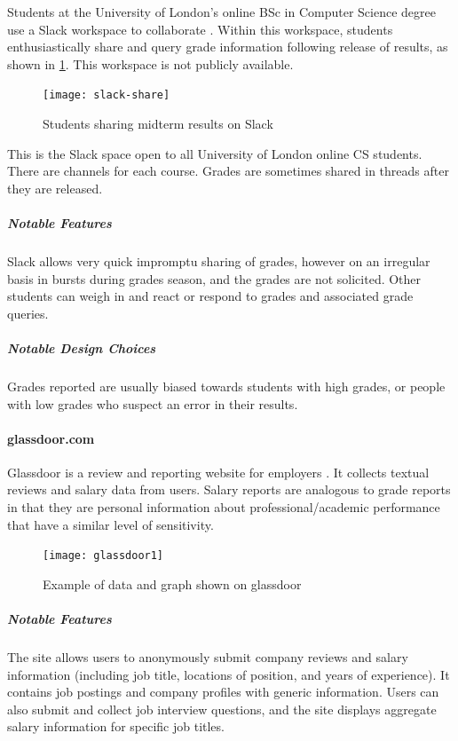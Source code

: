 Students at the University of London's online BSc in Computer Science degree use a Slack workspace to collaborate \cite{slack}. Within this workspace, students enthusiastically share and query grade information following release of results, as shown in \cref{fig:slack-share}. This workspace is not publicly available.

\begin{figure}[H]
\noindent \texttt{[image: slack-share]}
\centering
\caption{Students sharing midterm results on Slack}
\label{fig:slack-share}
\end{figure}

\noindent This is the Slack space open to all University of London online CS students. There are channels for each course. Grades are sometimes shared in threads after they are released.
\bigskip

\subparagraph{Notable Features}
Slack allows very quick impromptu sharing of grades, however on an irregular basis in bursts during grades season, and the grades are not solicited. Other students can weigh in and react or respond to grades and associated grade queries.

\subparagraph{Notable Design Choices}
Grades reported are usually biased towards students with high grades, or people with low grades who suspect an error in their results.

\paragraph{glassdoor.com}

Glassdoor is a review and reporting website for employers \cite{glassdoor}. It collects textual reviews and salary data from users. Salary reports are analogous to grade reports in that they are personal information about professional/academic performance that have a similar level of sensitivity.

\begin{figure}[H]
\noindent \texttt{[image: glassdoor1]}
\centering
\caption{Example of data and graph shown on glassdoor}
\label{fig:glassdoor-data}
\end{figure}

\subparagraph{Notable Features}
The site allows users to anonymously submit company reviews and salary information (including job title, locations of position, and years of experience). It contains job postings and company profiles with generic information. Users can also submit and collect job interview questions, and the site displays aggregate salary information for specific job titles.

